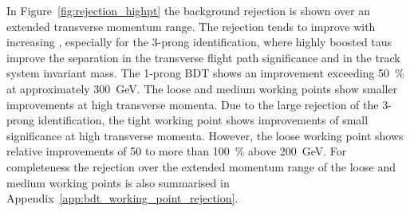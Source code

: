 In Figure~\ref{fig:rejection_highpt} the background rejection is shown over an
extended transverse momentum range. The rejection tends to improve with
increasing \tauhadvis \pt, especially for the 3-prong identification, where
highly boosted taus improve the separation in the transverse flight path
significance and in the track system invariant mass. The 1-prong BDT shows an
improvement exceeding \SI{50}{\percent} at approximately \SI{300}{\GeV}. The
loose and medium working points show smaller improvements at high transverse
momenta. Due to the large rejection of the 3-prong identification, the tight
working point shows improvements of small significance at high transverse
momenta. However, the loose working point shows relative improvements of
\num{50} to more than \SI{100}{\percent} above \SI{200}{\GeV}. For completeness
the rejection over the extended momentum range of the loose and medium working
points is also summarised in Appendix~\ref{app:bdt_working_point_rejection}.

